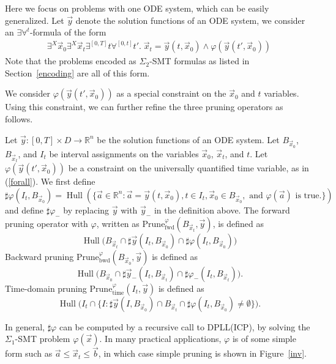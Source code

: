 \documentclass[11pt]{article}
\DeclareMathOperator{\Hull}{Hull}
\begin{document}
Here we focus on problems with one ODE system, which can be easily generalized. Let $\vec y$ denote the solution functions of an ODE system, we consider an $\exists\forall^t$-formula of the form
\begin{eqnarray}\label{forall}
\exists^X \vec x_0\exists^X \vec x_t\exists^{[0,T]} t \forall^{[0,t]} t'.\; \vec x_t = \vec y(t, \vec x_0)\wedge \varphi(\vec y (t', \vec x_0))
\end{eqnarray}
Note that the problems encoded as $\Sigma_2$-SMT formulas as listed in Section~\ref{encoding} are all of this form.

We consider $\varphi(\vec y(t', \vec x_0))$ as a special constraint on the $\vec x_0$ and $t$ variables. Using this constraint, we can further refine the three pruning operators as follows.
\begin{definition}
Let $\vec y:[0,T]\times D\rightarrow \mathbb{R}^n$ be the solution functions of an ODE system. Let $B_{\vec x_0}$, $B_{\vec x_t}$, and $I_{t}$ be interval assignments on the variables $\vec x_0$, $\vec x_t$, and $t$. Let $\varphi(\vec y(t', \vec x_0))$ be a constraint on the universally quantified time variable, as in (\ref{forall}).
We first define
$$\sharp\varphi(I_t, B_{\vec x_0})=\Hull(\{\vec a\in \mathbb{R}^n: \vec a = \vec y(t, \vec x_0), t\in I_t,\vec x_0\in B_{\vec x_0},\mbox{ and }\varphi(\vec a)\mbox{ is true.}\})$$
and define $\sharp\varphi_-$ by replacing $\vec y$ with $\vec y_-$ in the definition above. The forward pruning operator with $\varphi$, written as $\mathrm{Prune}_{\mathrm{fwd}}^{\varphi}(B_{\vec x_t}, \vec y)$, is defined as
$$\Hull\Big(B_{\vec x_t}\cap \sharp \vec y(I_t, B_{\vec x_0})\cap\sharp\varphi(I_t,B_{\vec x_0})\Big)$$
Backward pruning $\mathrm{Prune}^{\varphi}_{\mathrm{bwd}}(B_{\vec x_0}, \vec y)$ is defined as
$$\Hull\Big(B_{\vec x_0}\cap \sharp \vec y_-(I_t, B_{\vec x_t})\cap\sharp\varphi_-(I_t,B_{\vec x_t})\Big).$$
Time-domain pruning $\mathrm{Prune}_{\mathrm{time}}^{\varphi}(I_{t}, \vec y)$ is defined as
$$\Hull\Big(I_{t}\cap \{I : \sharp \vec y(I, B_{\vec x_0})\cap  B_{\vec x_t}\cap\sharp\varphi(I_t,B_{\vec x_0}) \not= \emptyset\}\Big).$$
\end{definition}
In general, $\sharp \varphi$ can be computed by a recursive call to DPLL(ICP), by solving the $\Sigma_1$-SMT problem $\varphi(\vec x)$. In many practical applications, $\varphi$ is of some simple form such as $\vec a\leq \vec x_t\leq \vec b$, in which case simple pruning is shown in Figure~\ref{inv}.
\end{document}
